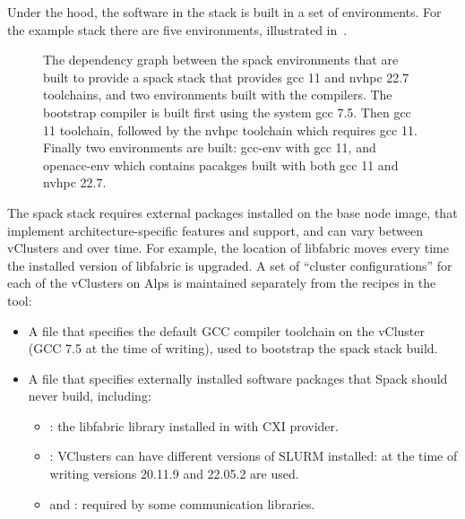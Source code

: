 Under the hood, the software in the stack is built in a set of \spack environments.
For the example stack there are five environments, illustrated in~.

\begin{figure}[htp!]
    \begin{center}
    
    \end{center}
    \caption{The dependency graph between the spack environments that are built to provide a spack stack that provides gcc 11 and nvhpc 22.7 toolchains, and two environments built with the compilers. The bootstrap compiler is built first using the system gcc 7.5. Then gcc 11 toolchain, followed by the nvhpc toolchain which requires gcc 11. Finally two environments are built: gcc-env with gcc 11, and openacc-env which contains pacakges built with both gcc 11 and nvhpc 22.7.}
    \label{fig:env-dag}
\end{figure}

The spack stack requires external packages installed on the base node image, that implement architecture-specific features and support, and can vary between vClusters and over time.
For example, the location of libfabric moves every time the installed version of libfabric is upgraded. 
A set of ``cluster configurations'' for each of the vClusters on Alps is maintained separately from the recipes in the \stackinator tool:
\begin{itemize}
    \item A \spack {} file that specifies the default GCC compiler toolchain on the vCluster (GCC 7.5 at the time of writing), used to bootstrap the spack stack build.
    \item A \spack {} file that specifies externally installed software packages that Spack should never build, including:
    \begin{itemize}
        \item {}: the libfabric library installed in  with CXI provider.
        \item {}: VClusters can have different versions of SLURM installed: at the time of writing versions 20.11.9 and 22.05.2 are used.
        \item {} and : required by some communication libraries.
    \end{itemize}
\end{itemize}


